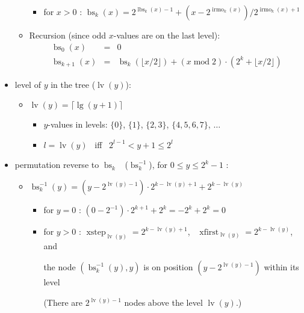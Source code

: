 \documentclass{letter}
\newcommand{\tmop}[1]{\ensuremath{\operatorname{#1}}}
\begin{document}
\begin{itemize}
\begin{itemize}
\begin{itemize}
      \item for $x > 0$ : $\tmop{bs}_k (x) = 2^{\tmop{lbs}_k (x) - 1} + (x -
      2^{\tmop{irmo}_k (x)}) / 2^{\tmop{irmo}_k (x) + 1}$
    \end{itemize}
    \item Recursion (since odd $x$-values are on the last level):
    \begin{eqnarray*}
      \tmop{bs}_0 (x) & = & 0\\
      \tmop{bs}_{k + 1} (x) & = & \tmop{bs}_k (\lfloor x / 2 \rfloor) + (x
      \tmop{mod} 2) \cdot (2^k + \lfloor x / 2 \rfloor)
    \end{eqnarray*}
  \end{itemize}
  \item level of $y$ in the tree ($\tmop{lv} (y)$):
  \begin{itemize}
    \item $\tmop{lv} (y) = \lceil \lg (y + 1) \rceil$
    \begin{itemize}
      \item $y$-values in levels: $\{0\}$, $\{1\}$, $\{2, 3\}$, $\{4, 5, 6,
      7\}$, $\ldots$
      
      \item $l = \tmop{lv} (y)$ \ iff \ $2^{l - 1} < y + 1 \leqslant 2^l$ 
    \end{itemize}
  \end{itemize}
  \item permutation reverse to $\tmop{bs}_k$ \ ($\tmop{bs}_k^{- 1}$), for $0
  \leqslant y \leqslant 2^k - 1$ :
  \begin{itemize}
    \item $\tmop{bs}_k^{- 1} (y) = (y - 2^{\tmop{lv} (y) - 1}) \cdot 2^{k -
    \tmop{lv} (y) + 1} + 2^{k - \tmop{lv} (y)}$
    \begin{itemize}
      \item for $y = 0$ : $(0 - 2^{- 1}) \cdot 2^{k + 1} + 2^k = - 2^k + 2^k =
      0$
      
      \item for $y > 0$ : $\tmop{xstep}_{\tmop{lv} (y)} = 2^{k - \tmop{lv} (y)
      + 1}$, \ $\tmop{xfirst}_{\tmop{lv} (y)} = 2^{k - \tmop{lv} (y)}$, and
      
      the node $(\tmop{bs}_k^{- 1} (y), y)$ is on position $(y - 2^{\tmop{lv}
      (y) - 1})$ within its level
      
      (There are $2^{\tmop{lv} (y) - 1}$ nodes above the level $\tmop{lv}
      (y)$.) 
    \end{itemize}
  \end{itemize}
\end{itemize}
\end{document}
